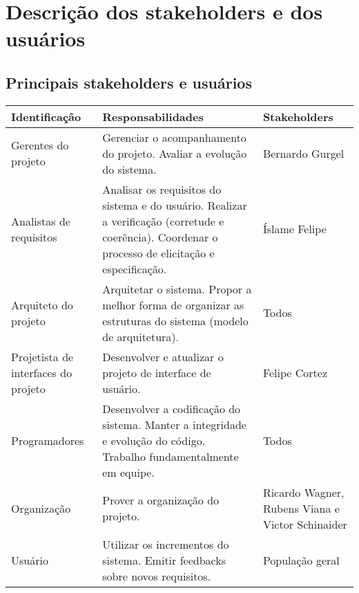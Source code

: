 \documentclass[12pt, a4paper]{article}
\begin{document}
    \section{Descrição dos stakeholders e dos usuários}
        \subsection{Principais stakeholders e usuários}

            \begin{tabu}{X | X | X}
                \hline
                \textbf{Identificação} &
                \textbf{Responsabilidades} &
                \textbf{Stakeholders}
                \\ \hline
                Gerentes do projeto & Gerenciar o acompanhamento do projeto.
Avaliar a evolução do sistema. &
                Bernardo Gurgel
                \\ \hline
                Analistas de requisitos & Analisar os requisitos do sistema e do usuário.
Realizar a verificação (corretude e coerência).
Coordenar o processo de elicitação e especificação.&
                Íslame Felipe
                \\ \hline
                Arquiteto do projeto & Arquitetar o sistema. Propor a melhor forma de organizar as estruturas do sistema (modelo de arquitetura).&
                Todos
                \\ \hline
                Projetista de interfaces do projeto & Desenvolver e atualizar o projeto de interface de usuário. &
                Felipe Cortez
                \\ \hline
                Programadores & Desenvolver a codificação do sistema. Manter a integridade e evolução do código. Trabalho fundamentalmente em equipe. &
                Todos
                \\ \hline
                Organização & Prover a organização do projeto. &
                Ricardo Wagner, Rubens Viana e Victor Schinaider
                \\ \hline
                Usuário &Utilizar os incrementos do sistema. Emitir feedbacks sobre novos requisitos.
 &
                População geral
                \\ \hline
            \end{tabu}
\end{document}
